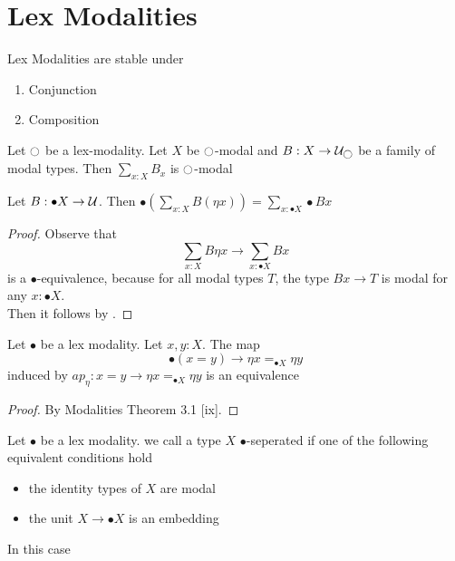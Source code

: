 
\section{Lex Modalities}
\begin{lemma}{\label{lemma:LexStability}}
	Lex Modalities are stable under 
	\begin{enumerate}
		\item Conjunction
		\item Composition
	\end{enumerate}
	
\end{lemma}
\begin{lemma}{\label{lemma:LexSumStable}}
	Let $\ci$ be a lex-modality. Let $X$ be $\ci$-modal and $B : X \to \cU_{\ci}$ be a family of modal types. Then $\sum_{x : X} B_x$ is $\ci$-modal
\end{lemma}
\begin{lemma}{\label{lemma:mod_comm_sum}}
	Let $B  : \bullet X \to \mathcal{U}$. Then $\bullet (\sum_{x : X} B (\eta x)) = \sum_{x : \bullet X} \bullet B x$
\end{lemma}
\begin{proof}
	Observe that 
	\[
	\sum_{x : X} B \eta x \to \sum_{x : \bullet X} B x
	\]
	is a $\bullet$-equivalence, because for all modal types $T$, the type $B x \to T$ is modal for any $x : \bullet X$. \\
	Then it follows by \todocite.
\end{proof}
\begin{lemma}{\label{lemma:idTypesOfSheafification}}
	Let $\bullet$ be a lex modality. Let $x , y : X$. The map
	\[
	\bullet(x = y) \to \eta x =_{\bullet X} \eta y
	\]
	induced by $ap_\eta : x = y \to \eta x =_{\bullet X} \eta y$ is an equivalence
\end{lemma}
\begin{proof}
 	By Modalities Theorem 3.1 [ix].
\end{proof}
\begin{definition}{\label{lemma:sep}}
	Let $\bullet$ be a lex modality. we call a type $X$ $\bullet$-seperated if one of the following equivalent conditions hold
	\begin{itemize}
		\item the identity types of $X$ are modal
		\item the unit $X \to \bullet X$ is an embedding
	\end{itemize}
In this case
\end{definition}
